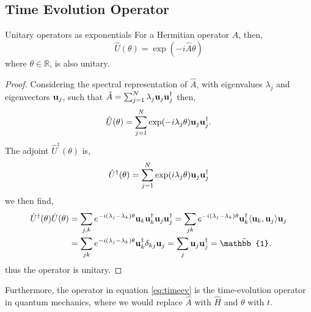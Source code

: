 \documentclass{book}
\def\innerproduct#1#2{{\langle #1},{#2 \rangle}}
\begin{document}
\subsection{Time Evolution Operator}
\begin{Theorems}{Unitary operators as exponentials}{}
	For a Hermitian operator $\hat{A}$, then,
	\begin{equation}
		\hat{U}(\theta) = \exp(-i\hat{A}\theta) \label{eq:timeev}
	\end{equation}
	where $\theta \in \mathbb{R}$, is also unitary.
\end{Theorems} 
\begin{proof}
	Considering the spectral representation of $\hat{A}$, with eigenvalues $\lambda_j$ and eigenvectors $\vb{u}_j$, such that $\hat{A} = \sum_{j=1}^N\lambda_j\vb{u}_j\vb{u}_j^{\dag}$ then,
	\begin{equation}
		\hat{U}(\theta) = \sum_{j=1}^N\exp(-i\lambda_j\theta) \vb{u}_j\vb{u}_j^{\dag}.
	\end{equation}
	The adjoint $\hat{U}^\dag(\theta)$ is,
	\begin{equation}
		\hat{U}^{\dag}(\theta) = \sum_{j=1}^N\exp(i\lambda_j\theta) \vb{u}_j\vb{u}_j^{\dag}
	\end{equation}
	we then find,
	\begin{equation}
		\begin{split}
			\hat{U}^\dag(\theta)\hat{U}(\theta) & = \sum_{j,k}e^{-i(\lambda_j - \lambda_k)\theta}\vb{u}_k\vb{u}_k^{\dag}\vb{u}_j\vb{u}_j^{\dag} = \sum_{jk}e^{-i(\lambda_j - \lambda_k)\theta}\vb{u}_k^{\dag}\innerproduct{\vb{u}_k}{\vb{u}_j}\vb{u}_j \\
			& = \sum_{jk}e^{-i(\lambda_j - \lambda_k)\theta}\vb{u}_k^{\dag}\delta_{kj}\vb{u}_j = \sum_j \vb{u}_j\vb{u}_j^{\dag} = \hat{\mathbb{1}}.
		\end{split}
	\end{equation}
	thus the operator is unitary.
\end{proof}
Furthermore, the operator in equation \eqref{eq:timeev} is the time-evolution operator in quantum mechanics, where we would replace $\hat{A}$ with $\hat{H}$ and $\theta$ with $t$.
\end{document}
